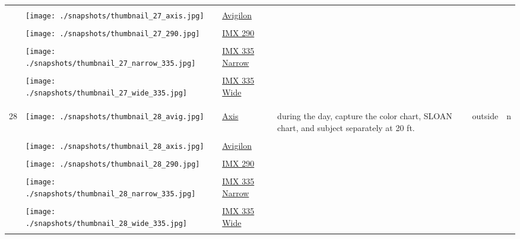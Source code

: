 \documentclass{article}%
\begin{document}
\begin{longtabu}{m{2.5cm} m{4cm} m{2cm} m{4cm} m{2cm} m{2cm}}
&&&&&\\%
&\texttt{[image: ./snapshots/thumbnail\_27\_axis.jpg]}&\href{https://drive.google.com/file/d/13KNtxjCPd_5YemUN7ZNBKm4awYd3OgEZ/view?usp=sharing}{Avigilon}&&&\\%
&&&&&\\%
&\texttt{[image: ./snapshots/thumbnail\_27\_290.jpg]}&\href{https://drive.google.com/file/d/1cgYz3Fe2YVhamTrYGzUOtzYqRdigghhy/view?usp=sharing}{IMX 290}&&&\\%
&&&&&\\%
&\texttt{[image: ./snapshots/thumbnail\_27\_narrow\_335.jpg]}&\href{https://drive.google.com/file/d/1tNcADzvq6sva8ROi9QFROD95bg4np1Bu/view?usp=sharing}{IMX 335 Narrow}&&&\\%
&&&&&\\%
&\texttt{[image: ./snapshots/thumbnail\_27\_wide\_335.jpg]}&\href{https://drive.google.com/file/d/1eGYqFac0B-xuU_kPwa73MxuttXxe8ima/view?usp=sharing}{IMX 335 Wide}&&&\\%
&&&&&\\%
&&&&&\\%
\hline%
&&&&&\\%
28&\texttt{[image: ./snapshots/thumbnail\_28\_avig.jpg]}&\href{https://drive.google.com/file/d/1qY24i4J5oMQCYwwCha-wzzJA9dQjl5yl/view?usp=sharing}{Axis}&during the day, capture the color chart, SLOAN chart, and subject separately at 20 ft.&outside&n\\%
&&&&&\\%
&\texttt{[image: ./snapshots/thumbnail\_28\_axis.jpg]}&\href{https://drive.google.com/file/d/1G5jidMohITcLxfSU-Nn2xugmFFi7NW39/view?usp=sharing}{Avigilon}&&&\\%
&&&&&\\%
&\texttt{[image: ./snapshots/thumbnail\_28\_290.jpg]}&\href{https://drive.google.com/file/d/1sBT6lgyg0SZvER9X1-2u4PFd8_tzKnuq/view?usp=sharing}{IMX 290}&&&\\%
&&&&&\\%
&\texttt{[image: ./snapshots/thumbnail\_28\_narrow\_335.jpg]}&\href{https://drive.google.com/file/d/1c6T0O9XYibiD5K6M2NAwgiK-9JzK0qOR/view?usp=sharing}{IMX 335 Narrow}&&&\\%
&&&&&\\%
&\texttt{[image: ./snapshots/thumbnail\_28\_wide\_335.jpg]}&\href{https://drive.google.com/file/d/1CTbVKhw8Crt5HzOWbPOLuWDYVuZol77X/view?usp=sharing}{IMX 335 Wide}&&&\\%
&&&&&\\%

\end{longtabu}
\end{document}
